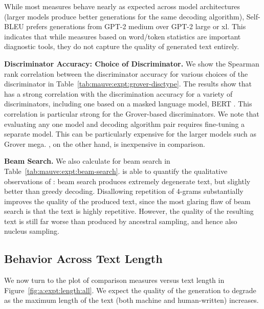 \documentclass{article}
\newcommand{\myparagraph}[1]{\par\noindent\textbf{{#1}.}} %
\theoremstyle{definition}
\newcommand{\name}{{\fontfamily{bch}\selectfont{\textsc{Mauve}}}\xspace}
\begin{document}
While most measures behave nearly as expected
across model architectures (larger models produce
better generations for the same decoding algorithm), Self-BLEU prefers generations from GPT-2 medium over GPT-2 large or xl. This indicates
that while measures based on word/token statistics
are important diagnostic tools, they do not capture
the quality of generated text entirely.


\myparagraph{Discriminator Accuracy: Choice of Discriminator}
We show the Spearman rank correlation between the discriminator accuracy 
for various choices of the discriminator in  Table~\ref{tab:mauve:expt:grover-disctype}.
The results show that \name has a strong correlation with the discrimination accuracy for a variety of discriminators, including one based on a masked language model, BERT \cite{devlin2018bert}. 
This correlation is particular strong for the Grover-based discriminators. 
We note that evaluating any one model and decoding algorithm pair requires fine-tuning a separate model. This can be particularly expensive for the larger models such as Grover mega. \name, on the other hand, is inexpensive in comparison.


\myparagraph{Beam Search}
We also calculate \name for beam search in Table~\ref{tab:mauve:expt:beam-search}. \name is able to quantify the qualitative observations of \citet{holtzman2019curious}: beam search produces extremely degenerate text, but slightly better than greedy decoding. Disallowing repetition of $4$-grams substantially improves the quality of the produced text, since the most glaring flaw of beam search is that the text is highly repetitive. However, the quality of the resulting text is still far worse than produced by ancestral sampling, and hence also nucleus sampling. 







\subsection{Behavior Across Text Length} \label{sec:supp:expt-length}

We now turn to the plot of comparison measures versus text length in Figure~\ref{fig:a:expt:length:all}. We expect the quality of the generation to degrade as the maximum length of the text (both machine and human-written) increases. 
\end{document}
